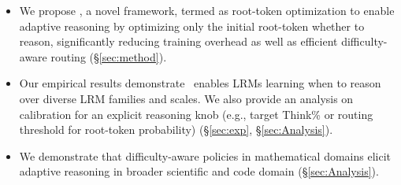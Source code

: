 \begin{itemize}[leftmargin=12pt, itemsep=2pt]
    \item We propose \Ours, a novel framework, termed as root-token optimization to enable adaptive reasoning by optimizing only the initial root-token whether to reason, significantly reducing training overhead as well as efficient difficulty-aware routing (\S\ref{sec:method}).

    \item Our empirical results demonstrate \Ours~enables LRMs learning when to reason over diverse LRM families and scales. We also provide an analysis on calibration for an explicit reasoning knob (e.g., target Think\% or routing threshold for root-token probability) (\S\ref{sec:exp}, \S\ref{sec:Analysis}).

    \item We demonstrate that difficulty-aware policies in mathematical domains elicit adaptive reasoning in broader scientific and code domain (\S\ref{sec:Analysis}).
\end{itemize}

